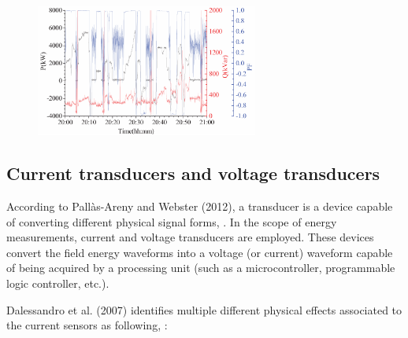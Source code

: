 \begin{figure}[h!]
	\centering
	\begin{minipage}{0.9\textwidth}
		\centering
				\vspace{-0.75em}
		\includegraphics[width=0.65\textwidth,keepaspectratio]{figures/32.EnergyS/liran2014}
				\vspace{-0.75em}
		\label{fig:liran2014}
	\end{minipage}%
	
\end{figure}


\subsection{Current transducers and voltage transducers}
\label{subs:322}	
	According to Pallàs-Areny and Webster (2012), a transducer is a device capable of converting different physical signal forms, \cite{webster2012}. In the scope of energy measurements, current and voltage transducers are employed. These devices convert the field energy waveforms into a voltage (or current) waveform capable of being acquired by a processing unit (such as a microcontroller, programmable logic controller, etc.).
	
	Dalessandro et al. (2007) identifies multiple different physical effects associated to the current sensors %
	as following, \cite{Dalessandro2007}:
	
